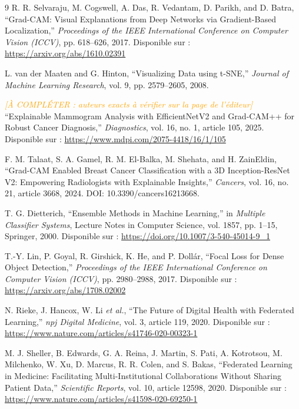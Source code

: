 \documentclass[12pt,a4paper]{report}
\newcommand{\todo}[1]{\textcolor{orange}{\textit{[À COMPLÉTER : #1]}}}
\begin{document}
\begin{thebibliography}{9}
R. R. Selvaraju, M. Cogswell, A. Das, R. Vedantam, D. Parikh, and D. Batra,
``Grad-CAM: Visual Explanations from Deep Networks via Gradient-Based Localization,''
\textit{Proceedings of the IEEE International Conference on Computer Vision (ICCV)}, pp. 618--626, 2017.
Disponible sur : \url{https://arxiv.org/abs/1610.02391}

L. van der Maaten and G. Hinton,
``Visualizing Data using t-SNE,''
\textit{Journal of Machine Learning Research}, vol. 9, pp. 2579--2605, 2008.

\todo{auteurs exacts à vérifier sur la page de l'éditeur}
``Explainable Mammogram Analysis with EfficientNetV2 and Grad-CAM++ for Robust Cancer Diagnosis,''
\textit{Diagnostics}, vol. 16, no. 1, article 105, 2025.
Disponible sur : \url{https://www.mdpi.com/2075-4418/16/1/105}

F. M. Talaat, S. A. Gamel, R. M. El-Balka, M. Shehata, and H. ZainEldin,
``Grad-CAM Enabled Breast Cancer Classification with a 3D Inception-ResNet V2: Empowering Radiologists with Explainable Insights,''
\textit{Cancers}, vol. 16, no. 21, article 3668, 2024.
DOI: 10.3390/cancers16213668.

T. G. Dietterich,
``Ensemble Methods in Machine Learning,''
in \textit{Multiple Classifier Systems}, Lecture Notes in Computer Science, vol. 1857, pp. 1--15, Springer, 2000.
Disponible sur : \url{https://doi.org/10.1007/3-540-45014-9_1}

T.-Y. Lin, P. Goyal, R. Girshick, K. He, and P. Dollár,
``Focal Loss for Dense Object Detection,''
\textit{Proceedings of the IEEE International Conference on Computer Vision (ICCV)}, pp. 2980--2988, 2017.
Disponible sur : \url{https://arxiv.org/abs/1708.02002}

N. Rieke, J. Hancox, W. Li \textit{et al.},
``The Future of Digital Health with Federated Learning,''
\textit{npj Digital Medicine}, vol. 3, article 119, 2020.
Disponible sur : \url{https://www.nature.com/articles/s41746-020-00323-1}

M. J. Sheller, B. Edwards, G. A. Reina, J. Martin, S. Pati, A. Kotrotsou, M. Milchenko, W. Xu, D. Marcus, R. R. Colen, and S. Bakas,
``Federated Learning in Medicine: Facilitating Multi-Institutional Collaborations Without Sharing Patient Data,''
\textit{Scientific Reports}, vol. 10, article 12598, 2020.
Disponible sur : \url{https://www.nature.com/articles/s41598-020-69250-1}


\end{thebibliography}
\end{document}
